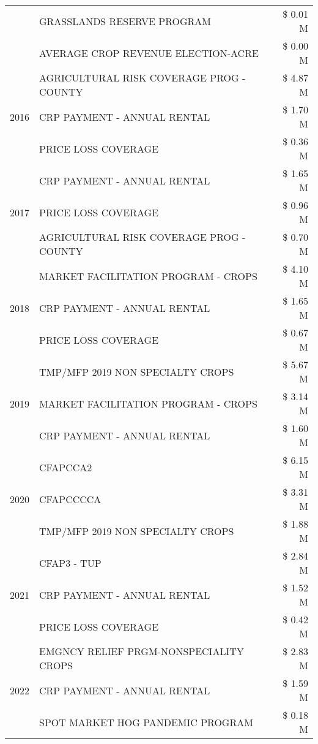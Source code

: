 \begin{tabular}{llr}
 & GRASSLANDS RESERVE PROGRAM & \$ 0.01 M \\
 & AVERAGE CROP REVENUE ELECTION-ACRE & \$ 0.00 M \\
\cline{1-3}
\multirow[t]{3}{*}{2016} & AGRICULTURAL RISK COVERAGE PROG - COUNTY & \$ 4.87 M \\
 & CRP PAYMENT - ANNUAL RENTAL & \$ 1.70 M \\
 & PRICE LOSS COVERAGE & \$ 0.36 M \\
\cline{1-3}
\multirow[t]{3}{*}{2017} & CRP PAYMENT - ANNUAL RENTAL & \$ 1.65 M \\
 & PRICE LOSS COVERAGE & \$ 0.96 M \\
 & AGRICULTURAL RISK COVERAGE PROG - COUNTY & \$ 0.70 M \\
\cline{1-3}
\multirow[t]{3}{*}{2018} & MARKET FACILITATION PROGRAM - CROPS & \$ 4.10 M \\
 & CRP PAYMENT - ANNUAL RENTAL & \$ 1.65 M \\
 & PRICE LOSS COVERAGE & \$ 0.67 M \\
\cline{1-3}
\multirow[t]{3}{*}{2019} & TMP/MFP 2019 NON SPECIALTY CROPS & \$ 5.67 M \\
 & MARKET FACILITATION PROGRAM - CROPS & \$ 3.14 M \\
 & CRP PAYMENT - ANNUAL RENTAL & \$ 1.60 M \\
\cline{1-3}
\multirow[t]{3}{*}{2020} & CFAPCCA2 & \$ 6.15 M \\
 & CFAPCCCCA & \$ 3.31 M \\
 & TMP/MFP 2019 NON SPECIALTY CROPS & \$ 1.88 M \\
\cline{1-3}
\multirow[t]{3}{*}{2021} & CFAP3 - TUP & \$ 2.84 M \\
 & CRP PAYMENT - ANNUAL RENTAL & \$ 1.52 M \\
 & PRICE LOSS COVERAGE & \$ 0.42 M \\
\cline{1-3}
\multirow[t]{3}{*}{2022} & EMGNCY RELIEF PRGM-NONSPECIALITY CROPS & \$ 2.83 M \\
 & CRP PAYMENT - ANNUAL RENTAL & \$ 1.59 M \\
 & SPOT MARKET HOG PANDEMIC PROGRAM & \$ 0.18 M \\
\cline{1-3}
\bottomrule
\end{tabular}
